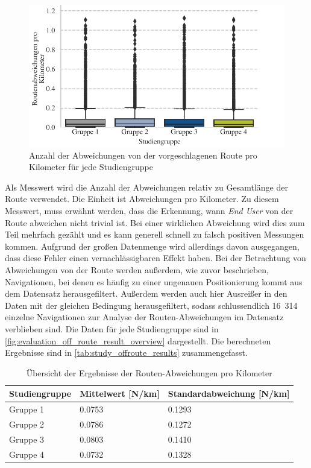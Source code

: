 \begin{figure}[htb!]
    \centering
    \includegraphics[width=\textwidth]{contents/06_model_evaluation/02_evaluation/res/off_route_result_overview.pdf}
    \caption{Anzahl der Abweichungen von der vorgeschlagenen Route pro Kilometer für jede Studiengruppe}
    \label{fig:evaluation_off_route_result_overview}
\end{figure}

Als Messwert wird die Anzahl der Abweichungen relativ zu Gesamtlänge der Route verwendet. Die Einheit ist Abweichungen pro Kilometer. Zu diesem Messwert, muss erwähnt werden, dass die Erkennung, wann \textit{End User} von der Route abweichen nicht trivial ist. Bei einer wirklichen Abweichung wird dies zum Teil mehrfach gezählt und es kann generell schnell zu falsch positiven Messungen kommen. Aufgrund der großen Datenmenge wird allerdings davon ausgegangen, dass diese Fehler einen vernachlässigbaren Effekt haben. Bei der Betrachtung von Abweichungen von der Route werden außerdem, wie zuvor beschrieben, Navigationen, bei denen es häufig zu einer ungenauen Positionierung kommt aus dem Datensatz herausgefiltert. Außerdem werden auch hier Ausreißer in den Daten mit der gleichen Bedingung herausgefiltert, sodass schlussendlich 16~314 einzelne Navigationen zur Analyse der Routen-Abweichungen im Datensatz verblieben sind. Die Daten für jede Studiengruppe sind in \autoref{fig:evaluation_off_route_result_overview} dargestellt. Die berechneten Ergebnisse sind in \autoref{tab:study_offroute_results} zusammengefasst.

\begin{table}[htb!]
    \centering
    \begin{tabular}{p{}p{}p{}}
        \hline
        Studiengruppe  & Mittelwert [N/km] & Standardabweichung [N/km]\\
        \toprule
        Gruppe 1                & 0.0753 & 0.1293 \\
        Gruppe 2                & 0.0786 & 0.1272 \\
        Gruppe 3                & 0.0803 & 0.1410 \\
        Gruppe 4                & 0.0732 & 0.1328 \\
        \bottomrule
    \end{tabular}
    \caption{Übersicht der Ergebnisse der Routen-Abweichungen pro Kilometer}
    \label{tab:study_offroute_results}
\end{table}

